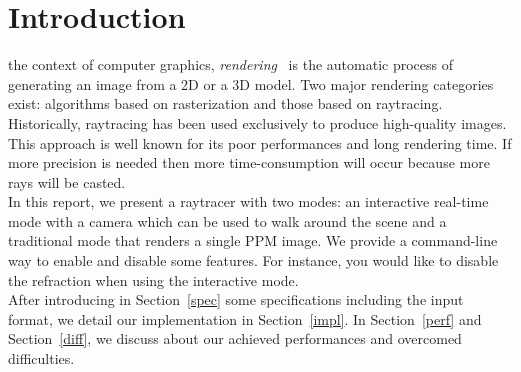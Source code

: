 \documentclass[a4paper,12pt,journal,twoside,compsoc]{PPIEEEtran}
\begin{document}


\maketitle

\IEEEdisplaynontitleabstractindextext
\IEEEpeerreviewmaketitle
\section{Introduction}
%
%
 the context of computer graphics, \textit{rendering}~\cite{rendering} is the automatic process of generating an image from a 2D or a 3D model. Two major rendering categories exist: algorithms based on rasterization and those based on raytracing. Historically, raytracing has been used exclusively to produce high-quality images. This approach is well known for its poor performances and long rendering time. If more precision is needed then more time-consumption will occur because more rays will be casted.\\
\indent In this report, we present a raytracer with two modes: an interactive
real-time mode with a camera which can be used to walk around the scene and a
traditional mode that renders a single PPM image. We provide a command-line way
to enable and disable some features. For instance, you would like to disable
the refraction when using the interactive mode.\\
\indent After introducing in Section~\ref{spec} some specifications including
the input format, we detail our implementation in Section~\ref{impl}. In
Section~\ref{perf} and Section~\ref{diff}, we discuss about our achieved
performances and overcomed difficulties.
\end{document}

